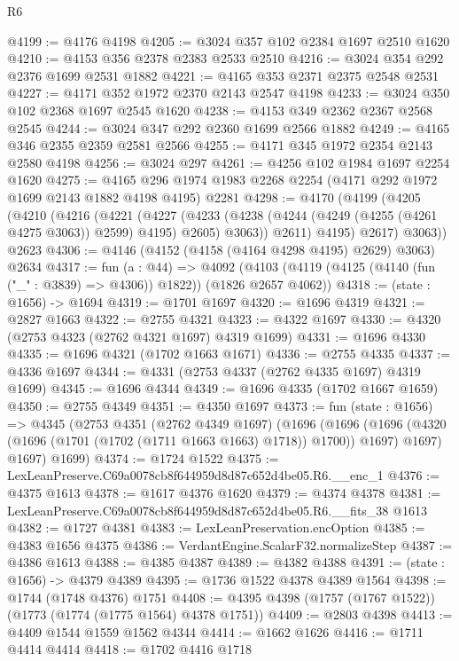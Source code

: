 \begin{lexlean}{R6}
\begin{coremodule}
@4199 := @4176 @4198
@4205 := @3024 @357 @102 @2384 @1697 @2510 @1620
@4210 := @4153 @356 @2378 @2383 @2533 @2510
@4216 := @3024 @354 @292 @2376 @1699 @2531 @1882
@4221 := @4165 @353 @2371 @2375 @2548 @2531
@4227 := @4171 @352 @1972 @2370 @2143 @2547 @4198
@4233 := @3024 @350 @102 @2368 @1697 @2545 @1620
@4238 := @4153 @349 @2362 @2367 @2568 @2545
@4244 := @3024 @347 @292 @2360 @1699 @2566 @1882
@4249 := @4165 @346 @2355 @2359 @2581 @2566
@4255 := @4171 @345 @1972 @2354 @2143 @2580 @4198
@4256 := @3024 @297
@4261 := @4256 @102 @1984 @1697 @2254 @1620
@4275 := @4165 @296 @1974 @1983 @2268 @2254 (@4171 @292 @1972 @1699 @2143 @1882 @4198 @4195) @2281
@4298 := @4170
    (@4199
      (@4205
        (@4210
          (@4216
            (@4221
              (@4227
                (@4233 (@4238 (@4244 (@4249 (@4255 (@4261 @4275 @3063)) @2599) @4195) @2605) @3063))
              @2611)
            @4195)
          @2617)
        @3063))
    @2623
@4306 := @4146 (@4152 (@4158 (@4164 @4298 @4195) @2629) @3063) @2634
@4317 := fun (a : @44) =>
  @4092 (@4103 (@4119 (@4125 (@4140 (fun ("_" : @3839) => @4306)) @1822)) (@1826 @2657 @4062))
@4318 := (state : @1656) -> @1694
@4319 := @1701 @1697
@4320 := @1696 @4319
@4321 := @2827 @1663
@4322 := @2755 @4321
@4323 := @4322 @1697
@4330 := @4320 (@2753 @4323 (@2762 @4321 @1697) @4319 @1699)
@4331 := @1696 @4330
@4335 := @1696 @4321 (@1702 @1663 @1671)
@4336 := @2755 @4335
@4337 := @4336 @1697
@4344 := @4331 (@2753 @4337 (@2762 @4335 @1697) @4319 @1699)
@4345 := @1696 @4344
@4349 := @1696 @4335 (@1702 @1667 @1659)
@4350 := @2755 @4349
@4351 := @4350 @1697
@4373 := fun (state : @1656) =>
  @4345
    (@2753
      @4351
      (@2762 @4349 @1697)
      (@1696
        (@1696 (@1696 (@4320 (@1696 (@1701 (@1702 (@1711 @1663 @1663) @1718)) @1700)) @1697) @1697)
        @1697)
      @1699)
@4374 := @1724 @1522
@4375 := LexLeanPreserve.C69a0078cb8f644959d8d87c652d4be05.R6.__enc_1
@4376 := @4375 @1613
@4378 := @1617 @4376 @1620
@4379 := @4374 @4378
@4381 := LexLeanPreserve.C69a0078cb8f644959d8d87c652d4be05.R6.__fits_38 @1613
@4382 := @1727 @4381
@4383 := LexLeanPreservation.encOption
@4385 := @4383 @1656 @4375
@4386 := VerdantEngine.ScalarF32.normalizeStep
@4387 := @4386 @1613
@4388 := @4385 @4387
@4389 := @4382 @4388
@4391 := (state : @1656) -> @4379 @4389
@4395 := @1736 @1522 @4378 @4389 @1564
@4398 := @1744 (@1748 @4376) @1751
@4408 := @4395 @4398 (@1757 (@1767 @1522)) (@1773 (@1774 (@1775 @1564) @4378 @1751))
@4409 := @2803 @4398
@4413 := @4409 @1544 @1559 @1562 @4344
@4414 := @1662 @1626
@4416 := @1711 @4414 @4414
@4418 := @1702 @4416 @1718

\end{coremodule}
\end{lexlean}
